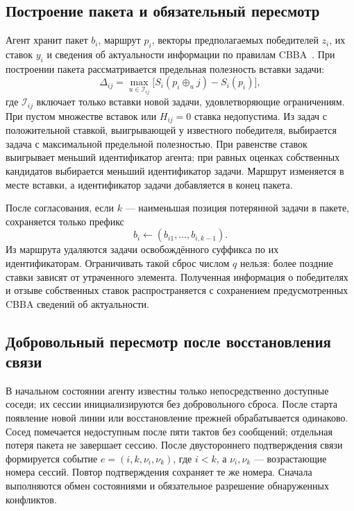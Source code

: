\documentclass{misisarticle}
\begin{document}
\subsection{Построение пакета и обязательный пересмотр}

Агент хранит пакет $b_i$, маршрут $p_i$, векторы предполагаемых победителей $z_i$, их ставок $y_i$ и сведения об актуальности информации по правилам CBBA~\cite{choi2009}. При построении пакета рассматривается предельная полезность вставки задачи:
\begin{equation}
 \Delta_{ij}=\max_{u\in\mathcal I_{ij}}
 \bigl[S_i(p_i\oplus_u j)-S_i(p_i)\bigr],
\end{equation}
где $\mathcal I_{ij}$ включает только вставки новой задачи, удовлетворяющие ограничениям. При пустом множестве вставок или $H_{ij}=0$ ставка недопустима. Из задач с положительной ставкой, выигрывающей у известного победителя, выбирается задача с максимальной предельной полезностью. При равенстве ставок выигрывает меньший идентификатор агента; при равных оценках собственных кандидатов выбирается меньший идентификатор задачи. Маршрут изменяется в месте вставки, а идентификатор задачи добавляется в конец пакета.

После согласования, если $k$ --- наименьшая позиция потерянной задачи в пакете, сохраняется только префикс
\begin{equation}
 b_i\leftarrow(b_{i1},\ldots,b_{i,k-1}).
\end{equation}
Из маршрута удаляются задачи освобождённого суффикса по их идентификаторам. Ограничивать такой сброс числом $q$ нельзя: более поздние ставки зависят от утраченного элемента. Полученная информация о победителях и отзыве собственных ставок распространяется с сохранением предусмотренных CBBA сведений об актуальности.

\subsection{Добровольный пересмотр после восстановления связи}

В начальном состоянии агенту известны только непосредственно доступные соседи; их сессии инициализируются без добровольного сброса. После старта появление новой линии или восстановление прежней обрабатывается одинаково. Сосед помечается недоступным после пяти тактов без сообщений; отдельная потеря пакета не завершает сессию. После двустороннего подтверждения связи формируется событие $e=(i,k,\nu_i,\nu_k)$, где $i<k$, а $\nu_i,\nu_k$ --- возрастающие номера сессий. Повтор подтверждения сохраняет те же номера. Сначала выполняются обмен состояниями и обязательное разрешение обнаруженных конфликтов.
\end{document}
